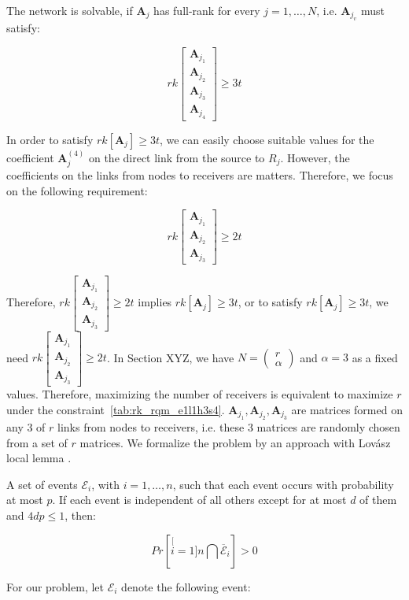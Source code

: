 The network is solvable, if $\boldsymbol{A}_{j}$ has full-rank for
every $j=1,\ldots,N$, i.e. $\boldsymbol{A}_{j_{v}}$ must satisfy:

\[
rk\left[\begin{array}{c}
\boldsymbol{A}_{j_{1}}\\
\boldsymbol{A}_{j_{2}}\\
\boldsymbol{A}_{j_{3}}\\
\boldsymbol{A}_{j_{4}}
\end{array}\right]\geq3t
\]

In order to satisfy $rk\left[\boldsymbol{A}_{j}\right]\geq3t$, we
can easily choose suitable values for the coefficient $\boldsymbol{A}_{j}^{(4)}$
on the direct link from the source to $R_{j}$. However, the coefficients
on the links from nodes to receivers are matters. Therefore, we focus
on the following requirement:

\begin{equation}
rk\left[\begin{array}{c}
\boldsymbol{A}_{j_{1}}\\
\boldsymbol{A}_{j_{2}}\\
\boldsymbol{A}_{j_{3}}
\end{array}\right]\geq2t\label{eq:rk_rqm_e1l1h3s4}
\end{equation}

Therefore, $rk\left[\begin{array}{c}
\boldsymbol{A}_{j_{1}}\\
\boldsymbol{A}_{j_{2}}\\
\boldsymbol{A}_{j_{3}}
\end{array}\right]\geq2t$ implies $rk\left[\boldsymbol{A}_{j}\right]\geq3t$, or to satisfy
$rk\left[\boldsymbol{A}_{j}\right]\geq3t$, we need $rk\left[\begin{array}{c}
\boldsymbol{A}_{j_{1}}\\
\boldsymbol{A}_{j_{2}}\\
\boldsymbol{A}_{j_{3}}
\end{array}\right]\geq2t$. In Section XYZ, we have $N=\left(\begin{array}{c}
r\\
\alpha
\end{array}\right)$ and $\alpha=3$ as a fixed values. Therefore, maximizing the number
of receivers is equivalent to maximize $r$ under the constraint~\ref{tab:rk_rqm_e1l1h3s4}.
$\boldsymbol{A}_{j_{1}},\boldsymbol{A}_{j_{2}},\boldsymbol{A}_{j_{3}}$
are matrices formed on any 3 of $r$ links from nodes to receivers,
i.e. these 3 matrices are randomly chosen from a set of $r$ matrices.
We formalize the problem by an approach with Lovász local lemma \cite{MosheSchwartz:2018}.
\begin{thm}
\label{thm:LLL}

A set of events $\mathcal{E}_{i}$, with $i=1,\ldots,n$, such that
each event occurs with probability at most $p$. If each event is
independent of all others except for at most $d$ of them and $4dp\leq1$,
then:

\[
Pr\left[\stackrel[i=1]{n}{\bigcap}\overline{\mathcal{E}}_{i}\right]>0
\]
\end{thm}
For our problem, let $\mathcal{E}_{i}$ denote the following event:

